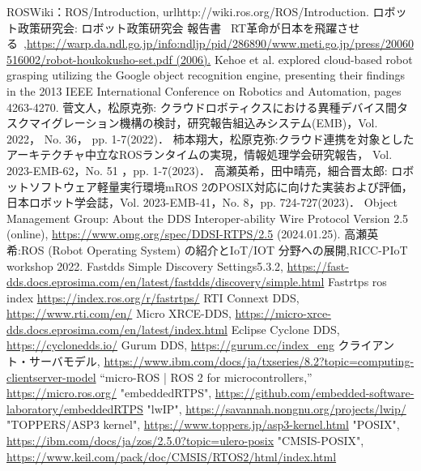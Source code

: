 
\begin{thebibliography}{99}
 ROSWiki：ROS/Introduction, url{http://wiki.ros.org/ROS/Introduction.}
 ロボット政策研究会: ロボット政策研究会 報告書 ~RT革命が日本を飛躍させる~,\url{https://warp.da.ndl.go.jp/info:ndljp/pid/286890/www.meti.go.jp/press/20060516002/robot-houkokusho-set.pdf (2006).}
 Kehoe et al. explored cloud-based robot grasping utilizing the Google object recognition engine, presenting their findings in the 2013 IEEE International Conference on Robotics and Automation, pages 4263-4270.
 菅文人，松原克弥: クラウドロボティクスにおける異種デバイス間タスクマイグレーション機構の検討，研究報告組込みシステム(EMB)，Vol. 2022， No. 36， pp. 1-7(2022)．
 柿本翔大，松原克弥:クラウド連携を対象としたアーキテクチャ中立なROSランタイムの実現，情報処理学会研究報告， Vol. 2023-EMB-62，No. 51 ，pp. 1-7(2023)．
 高瀬英希，田中晴亮，細合晋太郎: ロボットソフトウェア軽量実行環境mROS 2のPOSIX対応に向けた実装および評価，日本ロボット学会誌，Vol. 2023-EMB-41，No. 8，pp. 724-727(2023)．
 Object Management Group: About the DDS Interoper-ability Wire Protocol Version 2.5 (online), \url{https://www.omg.org/spec/DDSI-RTPS/2.5} (2024.01.25).
 高瀬英希:ROS (Robot Operating System) の紹介とIoT/IOT 分野への展開,RICC-PIoT workshop 2022.
 Fastdds Simple Discovery Settings5.3.2, \url{https://fast-dds.docs.eprosima.com/en/latest/fastdds/discovery/simple.html}
 Fastrtps ros index \url{https://index.ros.org/r/fastrtps/}
 RTI Connext DDS, \url{https://www.rti.com/en/}
Micro XRCE-DDS, \url{https://micro-xrce-dds.docs.eprosima.com/en/latest/index.html}
Eclipse Cyclone DDS, \url{https://cyclonedds.io/}
Gurum DDS, \url{https://gurum.cc/index_eng}
クライアント・サーバモデル, \url{https://www.ibm.com/docs/ja/txseries/8.2?topic=computing-clientserver-model}
 “micro-ROS | ROS 2 for microcontrollers,” \url{https://micro.ros.org/} 
 "embeddedRTPS", \url{https://github.com/embedded-software-laboratory/embeddedRTPS}
 "lwIP", \url{https://savannah.nongnu.org/projects/lwip/}
 "TOPPERS/ASP3 kernel", \url{https://www.toppers.jp/asp3-kernel.html}
 "POSIX", \url{https://ibm.com/docs/ja/zos/2.5.0?topic=ulero-posix}
 "CMSIS-POSIX", \url{https://www.keil.com/pack/doc/CMSIS/RTOS2/html/index.html}
\end{thebibliography}